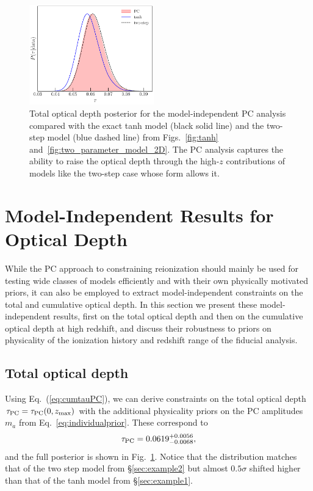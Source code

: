 \documentclass[prd,twocolumn,amsmath,amssymb,floatfix,superscriptaddress,nofootinbib]{revtex4-1}
\newcommand{\beq}{\begin{equation}}
\newcommand{\eeq}{\end{equation}}
\begin{document}
\begin{figure}[ht]
\includegraphics[width=0.48\textwidth]
{paper/plots/pl18_tau_posterior_tanh_vs_tanh_highz_vs_pc_dz_auto_zre_prior_6p1_normalized_by_max.pdf}
\caption{Total optical depth posterior for the model-independent PC analysis compared with the exact tanh model (black solid line) and the two-step model (blue dashed line) from Figs.~\ref{fig:tanh} and~\ref{fig:two_parameter_model_2D}. The PC analysis captures the ability to raise the optical depth through the high-$z$ contributions of models like the two-step case whose form allows it.
}
\label{fig:tauPC}
\end{figure}


\section{Model-Independent Results for Optical Depth}
\label{sec:modelindependent}

While the PC approach to constraining reionization should mainly be used for 
testing wide classes of models efficiently and with their own physically motivated priors, it can also be employed to extract model-independent constraints on the total and cumulative optical depth. 
In this section we present these model-independent results, first on the total optical depth and then on the cumulative optical depth at high redshift, and discuss their robustness to priors  on physicality of the ionization history and redshift range of the fiducial analysis.


\subsection{Total optical depth}

\label{sec:note_on_priors}


Using Eq.~(\ref{eq:cumtauPC}), we can derive constraints on the total optical
depth $\tau_{\rm PC}=\tau_{\rm PC}(0,z_{\rm max})$ with the additional physicality priors on the PC amplitudes $m_a$ from
Eq.~\ref{eq:individualprior}.  These 
correspond to 
%
\beq
\tau_{\rm PC} = 0.0619^{+0.0056}_{-0.0068},
\label{eq:tau_pc_zmax30}
\eeq  
%
and the full posterior is shown in Fig.~\ref{fig:tauPC}. 
Notice that the distribution matches that of the two step model from \S \ref{sec:example2} but almost $0.5\sigma$ shifted higher than that of the tanh model from \S \ref{sec:example1}.  
\end{document}
